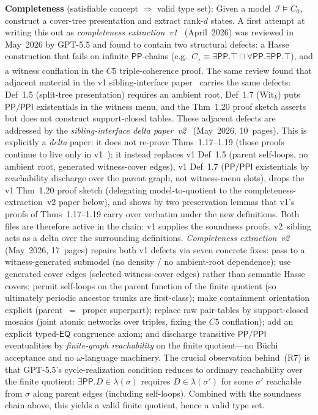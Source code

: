 \documentclass[
]{ceurart}
\theoremstyle{definition}
\newcommand{\EQ}{\ensuremath{\mathsf{EQ}}}
\newcommand{\PP}{\ensuremath{\mathsf{PP}}}
\newcommand{\PPI}{\ensuremath{\mathsf{PPI}}}
\begin{document}
\textbf{Completeness} (satisfiable concept $\Rightarrow$
valid type set):
Given a model~$\mathcal{I} \models C_0$, construct a cover-tree
presentation and extract rank-$d$ states.
A first attempt at writing this out as
\textit{completeness extraction~v1}~\cite{CompletenessExtractionV1}
(April~2026) was reviewed in May~2026 by GPT-5.5 and found to
contain two structural defects: a Hasse construction that fails on
infinite $\PP$-chains (e.g.\ $C_\uparrow \equiv \exists\PP.\top
\sqcap \forall\PP.\exists\PP.\top$), and a witness conflation in
the $C5$ triple-coherence proof.  The same review found that
adjacent material in the v1 sibling-interface
paper~\cite{SiblingCompleted} carries the same defects:
Def~1.5 (split-tree presentation) requires an ambient root, Def~1.7
($\mathrm{Wit}_k$) puts $\PP/\PPI$ existentials in the witness menu, and
the Thm~1.20 proof sketch asserts but does not construct
support-closed tables.  These adjacent defects are addressed by the
\textit{sibling-interface delta paper~v2}~\cite{SiblingInterfaceV2}
(May~2026, 10~pages).  This is explicitly a \emph{delta} paper: it
does not re-prove Thms~1.17--1.19 (those proofs continue to live
only in v1~\cite{SiblingCompleted}); it instead replaces v1 Def~1.5
(parent self-loops, no ambient root, generated witness-cover
edges), v1 Def~1.7 ($\PP/\PPI$ existentials by reachability
discharge over the parent graph, not witness-menu slots), drops the
v1 Thm~1.20 proof sketch (delegating model-to-quotient to the
completeness-extraction~v2 paper below), and shows by two
preservation lemmas that v1's proofs of Thms~1.17--1.19 carry over
verbatim under the new definitions.  Both files are therefore
active in the chain: v1 supplies the soundness proofs, v2~sibling
acts as a delta over the surrounding definitions.
\textit{Completeness extraction~v2}~\cite{CompletenessExtraction}
(May~2026, 17~pages) repairs both v1 defects via seven concrete
fixes: pass to a witness-generated submodel
(no density / no ambient-root dependence); use generated cover
edges (selected witness-cover edges) rather than semantic Hasse
covers; permit self-loops on the parent function of the finite
quotient (so ultimately periodic ancestor trunks are first-class);
make containment orientation explicit (parent~$=$~proper superpart);
replace raw pair-tables by support-closed mosaics (joint atomic
networks over triples, fixing the $C5$ conflation); add an
explicit typed-$\EQ$ congruence axiom; and discharge transitive
$\PP/\PPI$ eventualities by \emph{finite-graph reachability} on
the finite quotient---no B\"uchi acceptance and no
$\omega$-language machinery.
The crucial observation behind~(R7) is that GPT-5.5's
cycle-realization condition reduces to ordinary reachability over
the finite quotient: $\exists\PP.D \in \lambda(\sigma)$ requires
$D \in \lambda(\sigma')$ for some $\sigma'$ reachable from $\sigma$
along parent edges (including self-loops). Combined with the
soundness chain above, this yields a valid finite quotient, hence
a valid type set.
\end{document}
